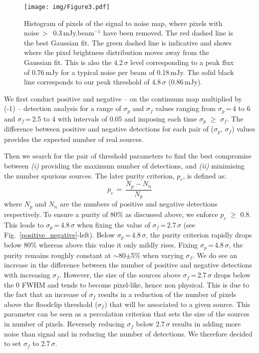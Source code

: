 \documentclass[longauth]{aa}
\begin{document}
\begin{figure}
\centering
\resizebox{\hsize}{!} {
\texttt{[image: img/Figure3.pdf]}
}
\caption{Histogram of pixels of the signal to noise map, where pixels with noise\,$>$\, 0.3\,mJy.beam$^{-1}$ have been removed. The red dashed line is the best Gaussian fit. The green dashed line is indicative and shows where the pixel brightness distribution moves away from the Gaussian fit. This is also the 4.2\,$\sigma$ level corresponding to a peak flux of 0.76\,mJy for a typical noise per beam of 0.18\,mJy. The solid black line corresponds to our peak threshold of 4.8\,$\sigma$ (0.86\,mJy).}
\label{histogramme_SN}
\end{figure}

We first conduct positive and negative -- on the continuum map multiplied by (-1) -- detection analysis for a range of $\sigma_p$ and $\sigma_f$ values ranging from $\sigma_p$\,=\,4 to 6 and $\sigma_f$\,=\,2.5 to 4
with intervals of 0.05 and imposing each time $\sigma_p$ $\ge$ $\sigma_f$. The difference between positive and negative detections for each pair of ($\sigma_p$, $\sigma_f$) values provides the expected number of real sources. 

Then we search for the pair of threshold parameters to find the best compromise between \textit{(i)} providing the maximum number of detections, and \textit{(ii)} minimising the number spurious sources.
The later purity criterion, $p_c$, is defined as:
\begin{equation}
p_c\,=\,\frac{N_p -N_n}{N_p}
\label{quality_criteria}
\end{equation}
\noindent where $N_p$ and $N_n$ are the numbers of positive and negative detections respectively. To ensure a purity of 80\% as discussed above, we enforce $p_c$ $\geq$ 0.8. This leads to $\sigma_p$\,=\,4.8\,$\sigma$ when fixing the value of $\sigma_f$\,=\,2.7\,$\sigma$ (see Fig.~\ref{positive_negative}-left). Below $\sigma_p$\,=\,4.8\,$\sigma$, the purity criterion rapidly drops below 80\% whereas above this value it only mildly rises. 
Fixing $\sigma_p$\,=\,4.8\,$\sigma$, the purity remains roughly constant at $\sim$80$\pm$5\% when varying $\sigma_f$.
We do see an increase in the difference between the number of positive and negative detections with increasing $\sigma_f$.
However, the size of the sources above $\sigma_f$\,=\,2.7\,$\sigma$ drops below the 0 FWHM and tends to become pixel-like, hence non physical. This is due to the fact that an increase of $\sigma_f$ results in a reduction of the number of pixels above the floodclip threshold ($\sigma_f$) that will be associated to a given source. This parameter can be seen as a percolation criterion that sets the size of the sources in number of pixels. Reversely reducing $\sigma_f$ below 2.7\,$\sigma$ results in adding more noise than signal and in reducing the number of detections. We therefore decided to set $\sigma_f$ to 2.7\,$\sigma$.
\end{document}
